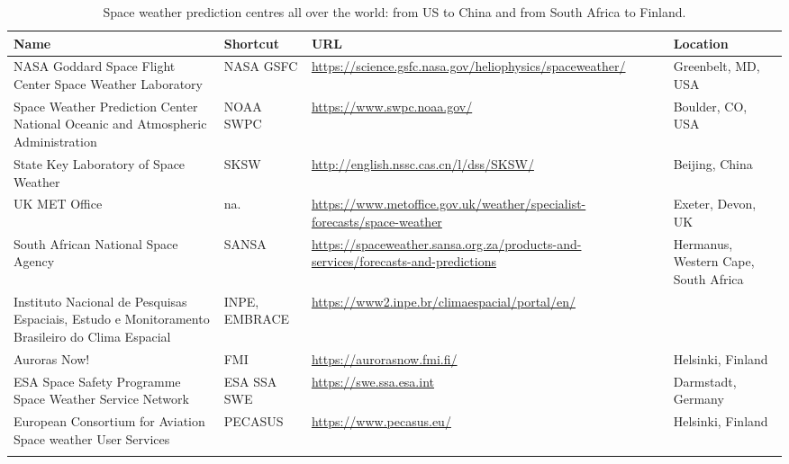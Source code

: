 \documentclass[sn-aps]{sn-jnl}%
\begin{document}
\begin{table}[h]
\centering
\begin{tabular}[c]{p{3cm}p{1.2cm}p{3.25cm}p{1.75cm}}
Name & Shortcut & URL & Location \\                    
\hline
\hline 
NASA Goddard Space Flight Center Space Weather Laboratory & NASA GSFC & \url{https://science.gsfc.nasa.gov/heliophysics/spaceweather/} & Greenbelt, MD, USA \\
\hline
Space Weather Prediction Center National Oceanic and Atmospheric Administration & NOAA SWPC & \url{https://www.swpc.noaa.gov/} & Boulder, CO, USA\\
\hline
State Key Laboratory of Space Weather & SKSW & \url{http://english.nssc.cas.cn/l/dss/SKSW/} & Beijing, China\\
\hline
UK MET Office & na. & \url{https://www.metoffice.gov.uk/weather/specialist-forecasts/space-weather} & Exeter, Devon, UK\\
\hline
South African National Space Agency & SANSA & \url{https://spaceweather.sansa.org.za/products-and-services/forecasts-and-predictions} & Hermanus, Western Cape, South Africa \\
\hline
Instituto Nacional de Pesquisas Espaciais, Estudo e Monitoramento Brasileiro do Clima Espacial & INPE, EMBRACE & \url{https://www2.inpe.br/climaespacial/portal/en/} & \\  
\hline  
Auroras Now! & FMI & \url{https://aurorasnow.fmi.fi/} & Helsinki, Finland\\
\hline 
ESA Space Safety Programme Space Weather Service Network & ESA SSA SWE & \url{https://swe.ssa.esa.int} & Darmstadt, Germany\\
\hline
European Consortium for Aviation Space weather User Services & PECASUS & \url{https://www.pecasus.eu/} & Helsinki, Finland \\ \\
\end{tabular}
\caption[Forecast organisations. ]{Space weather prediction centres all over the world: from US to China and from South Africa to Finland.}
\label{tab:agencies}
\end{table}

\pagebreak
\end{document}
